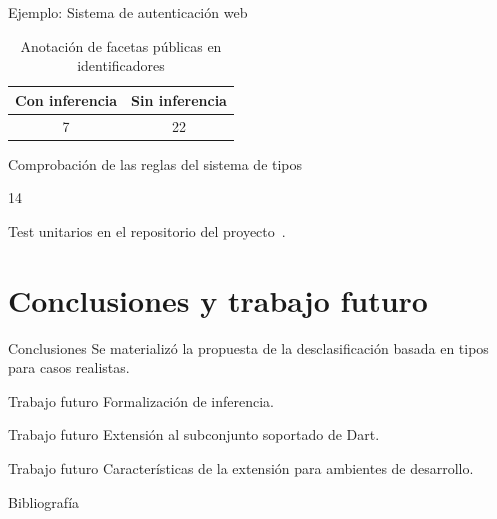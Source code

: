 \documentclass[aspectratio=169,18pt]{beamer}
\begin{document}
\begin{frame}[fragile]{Ejemplo: Sistema de autenticación web}
	\begin{table}
		\caption{Anotación de facetas públicas en identificadores}
		\begin{tabular}{c|c}
      Con inferencia & Sin inferencia\\
      \hline
      7 & 22\\
		\end{tabular}
	\end{table}
\end{frame}

\begin{frame}[fragile]{Comprobación de las reglas del sistema de tipos}
	\begin{center}
		\Huge{\alert{14}} \\
		\vspace{1cm}
	\end{center}
	\begin{center}
		Test unitarios en el repositorio del proyecto~\cite{repo}.
	\end{center}

\end{frame}

\section{Conclusiones y trabajo futuro}

\begin{frame}[fragile]{Conclusiones}
		Se materializó la propuesta de la desclasificación basada en tipos para casos realistas.
\end{frame}

\begin{frame}[fragile]{Trabajo futuro}
	Formalización de inferencia.
\end{frame}

\begin{frame}[fragile]{Trabajo futuro}
	Extensión al subconjunto soportado de Dart.
\end{frame}

\begin{frame}[fragile]{Trabajo futuro}
	Características de la extensión para ambientes de desarrollo.
\end{frame}

\begin{frame}[fragile]{Bibliografía}

  
  

\end{frame}
\end{document}
